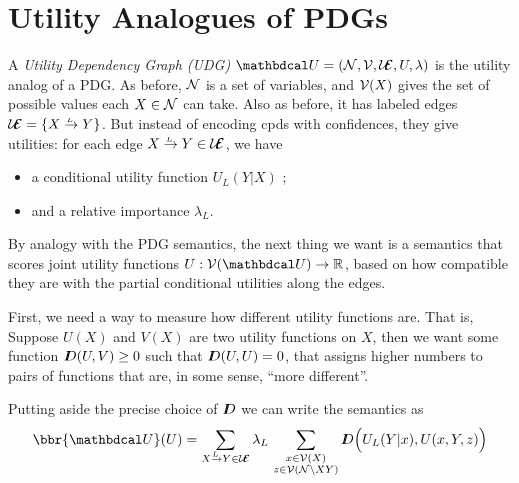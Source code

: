\documentclass{article}
\newcommand\UEd{\mathcal U\!\!\Ed}
\begin{document}
    \onecolumn
    \section{Utility Analogues of PDGs}

    \begin{defn}
        A \emph{Utility Dependency Graph (UDG)}  $\dg U = (\N, \V, \UEd, U, \lambda)$ is the utility analog of a PDG.  As before, $\mathcal N$ is a set of variables, and $\mathcal V(X)$ gives the set of possible values each $X \in \mathcal N$ can take.
        Also as before, it has labeled edges $\UEd = \{ \ed {L}XY \} $. But instead of encoding cpds with confidences, they give utilities: for each edge $\ed LXY \in \UEd$, we have
        \begin{itemize}
            \item  a conditional utility function $U_L(Y|X)$%
            ;
            \item and a relative importance $\lambda_L$.  \qedhere
        \end{itemize}
    \end{defn}

    By analogy with the PDG semantics, the next thing we want is a semantics that scores joint utility functions $U : \V(\dg U) \to \mathbb R$, based on how compatible they are with the partial conditional utilities along the edges.

    First, we need a way to measure how different utility functions are. That is,  Suppose $U(X)$ and $V(X)$ are two utility functions on $X$, then we want some function $I\mkern-8muD(U,V) \ge 0$ such that $I\mkern-8muD(U,U) = 0$, that assigns higher numbers to pairs of functions that are, in some sense, ``more different''.

    Putting aside the precise choice of $I\mkern-8muD$ we can write the semantics as
    \begin{equation}
        \bbr{\dg U}(U) =
             \sum_{\ed LXY \in \UEd} \lambda_L\, \sum_{\substack{x \in \V(X)\\z \in \V(\N\setminus XY)}}
             \thickD\Big( U_L(Y | x),  U(x,Y,z) \Big)
    \end{equation}
\end{document}
